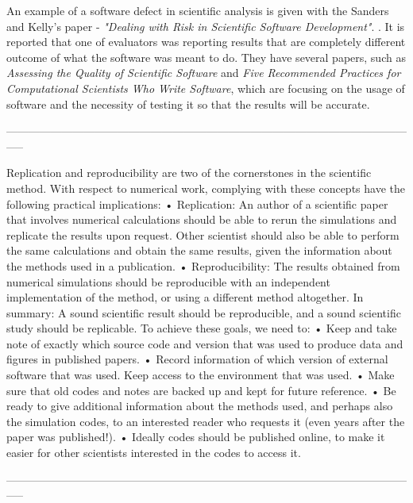 An example of a software defect in scientific analysis is given with the Sanders and Kelly's paper - \textit{"Dealing with Risk in Scientific Software Development"}. \cite{sanders2008dealing}. It is reported that one of evaluators was reporting results that are completely different outcome of what the software was meant to do. They have several papers, such as \textit{Assessing the Quality of Scientific Software} and \textit{Five Recommended Practices
for Computational Scientists Who Write Software}, which are focusing on the usage of software and the necessity of testing it so that the results will be accurate. \cite{kellyassessing}\cite{kelly2009five} 

-----------------------------------------------------------------------------------------------------------------

Replication and reproducibility are two of the cornerstones in the scientific method. With respect to numerical work, complying with these concepts have the following practical implications:
• Replication: An author of a scientific paper that involves numerical calculations should be able to
rerun the simulations and replicate the results upon request. Other scientist should also be able to
perform the same calculations and obtain the same results, given the information about the methods
used in a publication.
• Reproducibility: The results obtained from numerical simulations should be reproducible with an
independent implementation of the method, or using a different method altogether.
In summary: A sound scientific result should be reproducible, and a sound scientific study should be
replicable.
To achieve these goals, we need to:
• Keep and take note of exactly which source code and version that was used to produce data and figures
in published papers.
• Record information of which version of external software that was used. Keep access to the environment
that was used.
• Make sure that old codes and notes are backed up and kept for future reference.
• Be ready to give additional information about the methods used, and perhaps also the simulation
codes, to an interested reader who requests it (even years after the paper was published!).
• Ideally codes should be published online, to make it easier for other scientists interested in the codes
to access it. \cite{johansson2014introduction}

-----------------------------------------------------------------------------------------------------------------